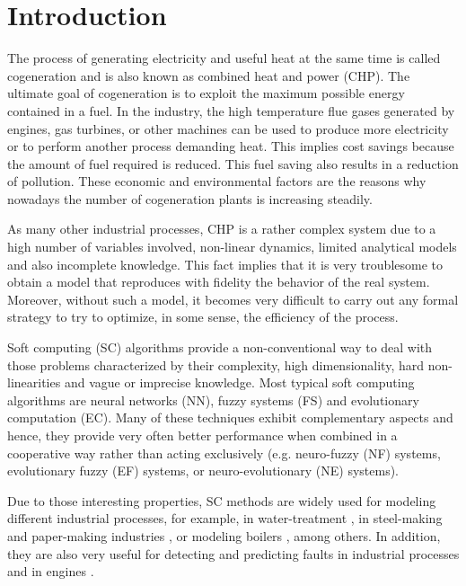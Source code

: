 \section{Introduction}
\label{intro}

The process of generating electricity and useful heat at the same time is called cogeneration and is also known as combined heat and power (CHP). The ultimate goal of cogeneration is to exploit the maximum possible energy contained in a fuel. In the industry, the high temperature flue gases generated by engines, gas turbines, or other machines can be used to produce more electricity or to perform another process demanding heat. This implies cost savings because the amount of fuel required is reduced. This fuel saving also results in a reduction of pollution. These economic and environmental factors are the reasons why nowadays the number of cogeneration plants is increasing steadily. 

As many other industrial processes, CHP is a rather complex system due to a high number of variables involved, non-linear dynamics, limited analytical models and also incomplete knowledge. This fact implies that it is very troublesome to obtain a model that reproduces with fidelity the behavior of the real system. Moreover, without such a model, it becomes very difficult to carry out any formal strategy to try to optimize, in some sense, the efficiency of the process.

Soft computing (SC) algorithms provide a non-conventional way to deal with those problems characterized by their complexity, high dimensionality, hard non-linearities and vague or imprecise knowledge. Most typical soft computing algorithms are neural networks (NN), fuzzy systems (FS) and evolutionary computation (EC). Many of these techniques exhibit complementary  aspects and hence, they provide very often better performance when combined in a cooperative way rather than acting exclusively (e.g. neuro-fuzzy (NF) systems, evolutionary fuzzy (EF) systems, or neuro-evolutionary (NE) systems).

Due to those interesting properties, SC methods are widely used for modeling different industrial processes, for example, in water-treatment \cite{Noshadi-2013}, in steel-making \cite{Isazadeh-2012} and paper-making industries \cite{Zhang-2012}, or modeling boilers \cite{Budnik-2012,Huang-2009}, among others. In addition, they are also very useful for detecting and predicting faults in industrial processes \cite{Rakhshani-2009,Lemma-2013} and in engines \cite{Shatnawi-2014,Ghate-2011,Refaat-2013}.

